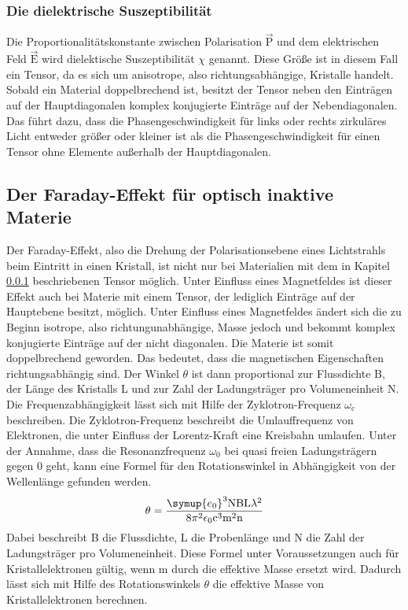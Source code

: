 \subsubsection{Die dielektrische Suszeptibilität}
\label{sssec:sus}
Die Proportionalitätskonstante zwischen Polarisation $\vec{\text{P}}$ und dem
elektrischen Feld $\vec{\text{E}}$ wird dielektische Suszeptibilität $\chi$
genannt. Diese Größe ist in diesem Fall ein Tensor, da es sich um anisotrope,
also richtungsabhängige, Kristalle handelt. Sobald ein Material doppelbrechend
ist, besitzt der Tensor neben den Einträgen auf der Hauptdiagonalen
komplex konjugierte Einträge auf der Nebendiagonalen. Das führt dazu, dass die
Phasengeschwindigkeit für links oder rechts zirkuläres Licht entweder größer
oder kleiner ist als die Phasengeschwindigkeit für einen Tensor ohne Elemente
außerhalb der Hauptdiagonalen.

\subsection{Der Faraday-Effekt für optisch inaktive Materie}
Der Faraday-Effekt, also die Drehung der Polarisationsebene eines Lichtstrahls
beim Eintritt in einen Kristall, ist nicht nur bei Materialien mit dem in
Kapitel \ref{sssec:sus} beschriebenen Tensor möglich. Unter Einfluss eines
Magnetfeldes ist dieser Effekt auch bei Materie mit einem Tensor, der
lediglich Einträge auf der Hauptebene besitzt, möglich. Unter Einfluss eines
Magnetfeldes ändert sich die zu Beginn isotrope, also richtungunabhängige, Masse
jedoch und bekommt komplex konjugierte Einträge auf der nicht diagonalen. Die
Materie ist somit doppelbrechend geworden. Das bedeutet, dass die magnetischen
Eigenschaften richtungsabhängig sind. Der Winkel $\theta$ ist dann
proportional zur Flussdichte $\text{B}$, der Länge des Kristalls $\text{L}$ und
zur Zahl der Ladungsträger pro Volumeneinheit $\text{N}$. Die
Frequenzabhängigkeit lässt sich mit Hilfe der Zyklotron-Frequenz
$\omega_{\text{c}}$
beschreiben. Die Zyklotron-Frequenz beschreibt die Umlauffrequenz von Elektronen,
die unter Einfluss der Lorentz-Kraft eine Kreisbahn umlaufen. Unter der Annahme,
dass die Resonanzfrequenz $\omega_0$ bei quasi freien Ladungsträgern gegen
0 geht, kann eine Formel für den Rotationswinkel in Abhängigkeit von der
Wellenlänge gefunden werden.
\begin{equation}
  \theta = \frac{\symup{e_0}^3 \text{N} \text{B} \text{L} \lambda^2}
  {8 \pi^2 \epsilon_0 \text{c}^3 \text{m}^2 \text{n}}
  \label{eqn:ekelgleichung}
\end{equation}
Dabei beschreibt B die Flussdichte, L die Probenlänge und N die Zahl der
Ladungsträger pro Volumeneinheit. Diese Formel unter Voraussetzungen auch
für Kristallelektronen gültig, wenn m durch die effektive Masse ersetzt wird.
Dadurch lässt sich mit Hilfe des Rotationswinkels $\theta$ die effektive
Masse von Kristallelektronen berechnen.
